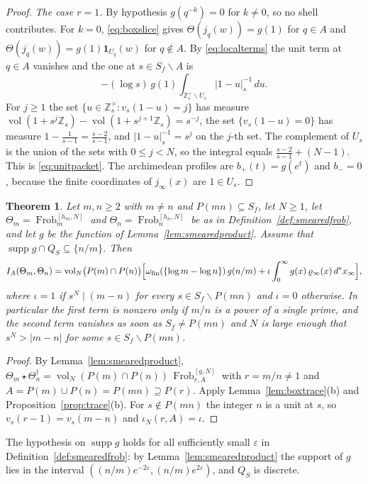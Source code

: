 \documentclass[11pt]{amsart}
\newtheorem{theorem}{Theorem}[section]
\theoremstyle{definition}
\newcommand{\Z}{\mathbb Z}
\newcommand{\Frob}{\operatorname{Frob}}
\newcommand{\supp}{\operatorname{supp}}
\newcommand{\vol}{\operatorname{vol}}
\begin{document}
\begin{proof}
\emph{The case $r=1$.} By hypothesis $g(q^{-k})=0$ for $k\ne0$, so no shell
contributes. For $k=0$, \eqref{eq:boxslice} gives $\Theta(j_q(w))=g(1)$ for
$q\in A$ and $\Theta(j_q(w))=g(1)\mathbf 1_{U_q}(w)$ for $q\notin A$. By
\eqref{eq:localterms} the unit term at $q\in A$ vanishes and the one at
$s\in S_f\smallsetminus A$ is
\[
  -(\log s)\,g(1)\int_{\Z_s^\times\smallsetminus U_s}|1-u|_s^{-1}\,du .
\]
For $j\ge1$ the set $\{u\in\Z_s^\times:v_s(1-u)=j\}$ has measure
$\vol(1+s^j\Z_s)-\vol(1+s^{j+1}\Z_s)=s^{-j}$, the set $\{v_s(1-u)=0\}$ has
measure $1-\tfrac1{s-1}=\tfrac{s-2}{s-1}$, and $|1-u|_s^{-1}=s^j$ on the
$j$-th set. The complement of $U_s$ is the union of the sets with $0\le j<N$,
so the integral equals $\tfrac{s-2}{s-1}+(N-1)$. This is
\eqref{eq:unitpacket}. The archimedean profiles are $b_+(t)=g(e^t)$ and
$b_-=0$, because the finite coordinates of $j_\infty(x)$ are $1\in U_s$.
\end{proof}

\begin{theorem}\label{thm:gramoff}
Let $m,n\ge2$ with $m\ne n$ and $P(mn)\subseteq S_f$, let $N\ge1$, let
$\Theta_m=\Frob_m^{[h_m,N]}$ and $\Theta_n=\Frob_n^{[h_n,N]}$ be as in
Definition~\ref{def:smearedfrob}, and let $g$ be the function of
Lemma~\ref{lem:smearedproduct}. Assume that $\supp g\cap Q_S\subseteq\{n/m\}$.
Then
\begin{equation}\label{eq:gramoffentry}
  I_A(\Theta_m,\Theta_n)=\vol_N\bigl(P(m)\cap P(n)\bigr)\Bigl[
   \omega_{\mathrm{fin}}(\{\log m-\log n\})\,g(n/m)
   +\iota\int_0^\infty g(x)\,\varrho_\infty(x)\,d^*x_\infty\Bigr],
\end{equation}
where $\iota=1$ if $s^N\mid(m-n)$ for every $s\in S_f\smallsetminus P(mn)$ and
$\iota=0$ otherwise. In particular the first term is nonzero only if $m/n$ is
a power of a single prime, and the second term vanishes as soon as
$S_f\ne P(mn)$ and $N$ is large enough that $s^N>|m-n|$ for some
$s\in S_f\smallsetminus P(mn)$.
\end{theorem}

\begin{proof}
By Lemma~\ref{lem:smearedproduct},
$\Theta_m\star\Theta_n^\dagger=\vol_N(P(m)\cap P(n))\,\Frob_{r,A}^{[g,N]}$ with
$r=m/n\ne1$ and $A=P(m)\cup P(n)=P(mn)\supseteq P(r)$. Apply
Lemma~\ref{lem:boxtrace}(b) and Proposition~\ref{prop:trace}(b). For
$s\notin P(mn)$ the integer $n$ is a unit at $s$, so
$v_s(r-1)=v_s(m-n)$ and $\iota_N(r,A)=\iota$.
\end{proof}

The hypothesis on $\supp g$ holds for all sufficiently small $\varepsilon$ in
Definition~\ref{def:smearedfrob}: by Lemma~\ref{lem:smearedproduct} the
support of $g$ lies in the interval
$((n/m)e^{-2\varepsilon},(n/m)e^{2\varepsilon})$, and $Q_S$ is discrete.
\end{document}
